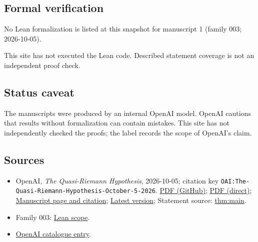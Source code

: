 \documentclass[11pt]{article}
\begin{document}
\subsection{Formal verification}
No Lean formalization is listed at this snapshot for manuscript 1 (family 003; 2026-10-05).

This site has not executed the Lean code. Described statement coverage is not an independent proof check.

\subsection{Status caveat}
The manuscripts were produced by an internal OpenAI model. OpenAI cautions that results without formalization can contain mistakes. This site has not independently checked the proofs; the label records the scope of OpenAI's claim.

\subsection{Sources}
\begin{itemize}
\item OpenAI, \emph{The Quasi-Riemann Hypothesis}, 2026-10-05; citation key \texttt{OAI:The-Quasi-Riemann-Hypothesis-October-5-2026}. \href{https://github.com/openai/math/blob/adc7f1241b42e322a6451854ab7e4b4c146bf78a/preprints/The-Quasi-Riemann-Hypothesis-October-5-2026/paper2.pdf}{PDF (GitHub)}; \href{https://github.com/openai/math/raw/adc7f1241b42e322a6451854ab7e4b4c146bf78a/preprints/The-Quasi-Riemann-Hypothesis-October-5-2026/paper2.pdf}{PDF (direct)}; \href{https://github.com/openai/math/blob/adc7f1241b42e322a6451854ab7e4b4c146bf78a/preprints/The-Quasi-Riemann-Hypothesis-October-5-2026/README.md}{Manuscript page and citation}; \href{https://github.com/openai/math/blob/main/preprints/The-Quasi-Riemann-Hypothesis-October-5-2026/paper2.pdf}{Latest version}; Statement source: \href{https://github.com/openai/math/blob/adc7f1241b42e322a6451854ab7e4b4c146bf78a/preprints/The-Quasi-Riemann-Hypothesis-October-5-2026/build/paper2.tex\#L73}{thm:main}.
\item Family 003: \href{https://github.com/openai/math/blob/adc7f1241b42e322a6451854ab7e4b4c146bf78a/lean/docs/003.md}{Lean scope}.
\item \href{https://github.com/openai/math/blob/adc7f1241b42e322a6451854ab7e4b4c146bf78a/CONTENTS.md}{OpenAI catalogue entry}.
\end{itemize}
\end{document}
